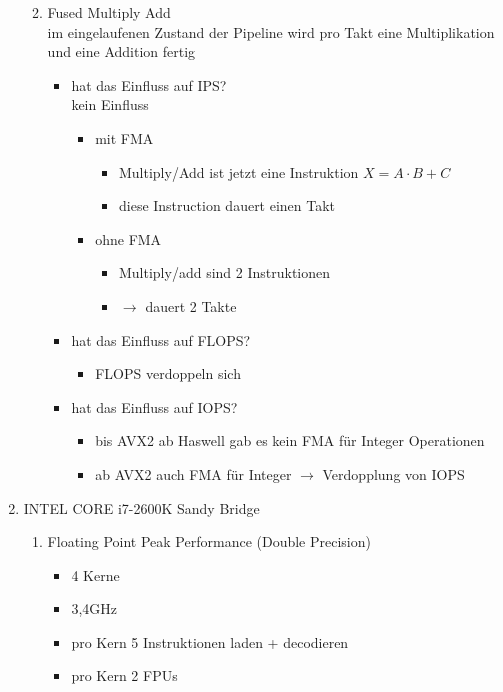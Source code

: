 \begin{enumerate}
\begin{enumerate}
\begin{itemize}
		\end{itemize}
		\item Fused Multiply Add\\
		im eingelaufenen Zustand der Pipeline wird pro Takt eine Multiplikation und eine Addition fertig
		\begin{itemize}
			\item hat das Einfluss auf IPS?\\
			kein Einfluss
			\begin{itemize}
				\item mit FMA 
				\begin{itemize}
					\item Multiply/Add ist jetzt eine Instruktion \(X = A \cdot B + C\)
					\item diese Instruction dauert einen Takt
				\end{itemize}
				\item ohne FMA
				\begin{itemize}
					\item Multiply/add sind 2 Instruktionen
					\item \(\to\) dauert 2 Takte
				\end{itemize}
			\end{itemize}
			\item hat das Einfluss auf FLOPS?
			\begin{itemize}
				\item FLOPS verdoppeln sich
			\end{itemize}
			\item hat das Einfluss auf IOPS?
			\begin{itemize}
				\item bis AVX2 ab Haswell gab es kein FMA für Integer Operationen
				\item ab AVX2 auch FMA für Integer \(\to\) Verdopplung von IOPS
			\end{itemize}
		\end{itemize}
	\end{enumerate}
	\item INTEL CORE i7-2600K Sandy Bridge
	\begin{enumerate}
		\item Floating Point Peak Performance (Double Precision)
		\begin{itemize}
			\item 4 Kerne
			\item 3,4GHz
			\item pro Kern 5 Instruktionen laden + decodieren
			\item pro Kern 2 FPUs

\end{itemize}
\end{enumerate}
\end{enumerate}
